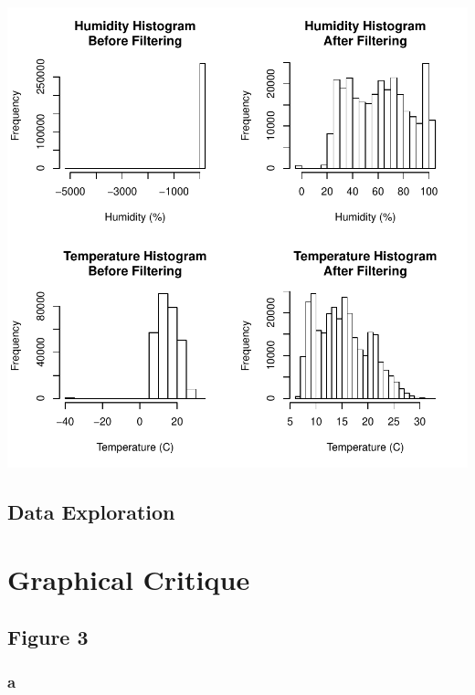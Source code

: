 \documentclass[english]{article}\usepackage[]{graphicx}\usepackage[]{color}
\makeatletter
\def\maxwidth{ %
  \ifdim\Gin@nat@width>\linewidth
    \linewidth
  \else
    \Gin@nat@width
  \fi
}
\newenvironment{knitrout}{}{} %
\makeatother
\begin{document}
\begin{knitrout}
\color{fgcolor}

{\centering \includegraphics[width=\maxwidth]{figure/load-data-1} 

}



\end{knitrout}

\subsection{Data Exploration}

\section{Graphical Critique}

\subsection{Figure 3}

\subsubsection{a}
\end{document}

